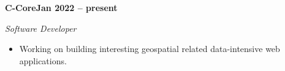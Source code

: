 \vspace{0.1cm}
\textbf{C-Core\hfill Jan 2022 -- present} \par
\textit{Software Developer} \par
\begin{itemize}
	\item Working on building interesting geospatial related data-intensive web applications.
\end{itemize} \par